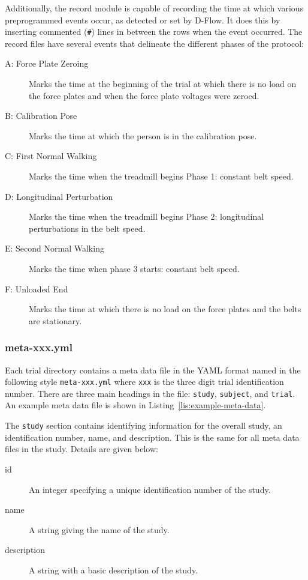 \documentclass[fleqn,12pt]{wlpeerj}
\begin{document}
Additionally, the record module is capable of recording the time at which
various preprogrammed events occur, as detected or set by D-Flow. It does this
by inserting commented (\verb|#|) lines in between the rows when the event
occurred. The record files have several events that delineate the different
phases of the protocol:
%
\begin{description}
  \item[A: Force Plate Zeroing] Marks the time at the beginning of the trial at
    which there is no load on the force plates and when the force plate
    voltages were zeroed.
  \item[B: Calibration Pose] Marks the time at which the person is in the
    calibration pose.
  \item[C: First Normal Walking] Marks the time when the treadmill begins Phase
    1: constant belt speed.
  \item[D: Longitudinal Perturbation] Marks the time when the treadmill begins
    Phase 2: longitudinal perturbations in the belt speed.
  \item[E: Second Normal Walking] Marks the time when phase 3 starts: constant
    belt speed.
  \item[F: Unloaded End] Marks the time at which there is no load on the force
    plates and the belts are stationary.
\end{description}

\subsubsection*{meta-xxx.yml}

Each trial directory contains a meta data file in the YAML format named in the
following style \verb|meta-xxx.yml| where \verb|xxx| is the three digit trial
identification number. There are three main headings in the file: \verb+study+,
\verb+subject+, and \verb+trial+. An example meta data file is shown in
Listing~\ref{lis:example-meta-data}.

The \verb+study+ section contains identifying information for the overall
study, an identification number, name, and description. This is the same for
all meta data files in the study. Details are given below:
%
\begin{description}
  \item[id] An integer specifying a unique identification number of the study.
  \item[name] A string giving the name of the study.
  \item[description] A string with a basic description of the study.
\end{description}
\end{document}

